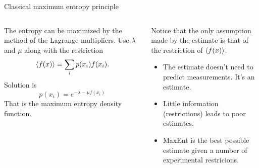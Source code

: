 \begin{frame}{Classical maximum entropy principle}
    \begin{columns}
        \begin{column}{0.5\textwidth}
            The entropy can be maximized by the method of the Lagrange multipliers. Use $\lambda$ and $\mu$
            along with the restriction
            \begin{equation*}
                \expval{f(x)}=\sum_{i}p(x_{i})f(x_{i}).
            \end{equation*}
            Solution is
            \begin{equation*}
                p(x_{i})=e^{-\lambda-\mu f(x_{i})}
            \end{equation*}
            That is the maximum entropy density function.
        \end{column}
        \begin{column}{0.5\textwidth}
            Notice that the only assumption made by the estimate is that of the restriction of $\expval{f(x)}$.
            \begin{itemize}
                \item The estimate doesn't need to predict measurements. It's an estimate.
                \item Little information (restrictions) leads to poor estimates.
                \item MaxEnt is the best possible estimate given a number of experimental restricions.
            \end{itemize}
        \end{column}
    \end{columns}
\end{frame}


